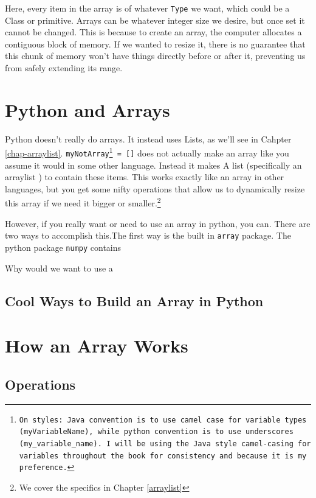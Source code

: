 \documentclass[10pt,a4paper]{book}
\begin{document}
Here, every item in the array is of whatever \texttt{Type} we want, which could be a Class or primitive.   
Arrays can be whatever integer size we desire, but once set it cannot be changed.
This is because to create an array, the computer allocates a contiguous block of memory.
If we wanted to resize it, there is no guarantee that this chunk of memory won't have things directly before or after it, preventing us from safely extending its range.

\section{Python and Arrays}
Python doesn't really do arrays.
It instead uses Lists, as we'll see in Cahpter \ref{chap-arraylist}.
\texttt{myNotArray\footnote{On styles:  Java convention is to use camel case for variable types (\texttt{myVariableName}), while python convention is to use underscores (\texttt{my\_variable\_name}).  I will be using the Java style camel-casing for variables throughout the book for consistency and because it is my preference.} = []} does not actually make an array like you assume it would in some other language.  Instead it makes A list (specifically an arraylist ) to contain these items.
This works exactly like an array in other languages, but you get some nifty operations that allow us to dynamically resize this array if we need it bigger or smaller.\footnote{We cover the specifics in Chapter \ref{arraylist}}



However, if you really want or need to use an array in python, you can.
There are two ways to accomplish this.The first way is the built in \texttt{array} package.    The python package \texttt{numpy} contains

Why would we want to use a 


\subsection{Cool Ways to Build an Array in Python}







\section{How an Array Works}


\subsection{Operations}
\end{document}
